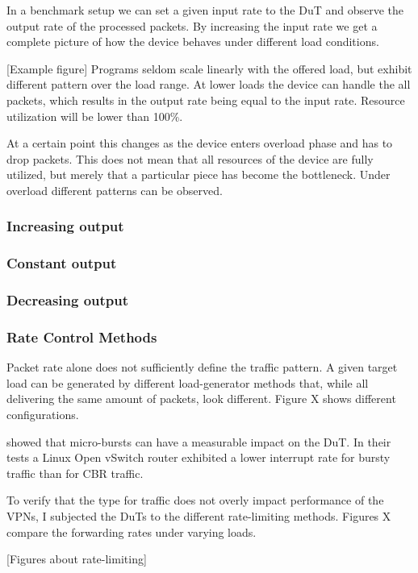 \documentclass[IN,11pt,twoside,openright,master,english]{tumthesis}
\begin{document}
In a benchmark setup we can set a given input rate to the DuT and observe the output rate of the processed packets. 
By increasing the input rate we get a complete picture of how the device behaves under different load conditions.

[Example figure]
Programs seldom scale linearly with the offered load, but exhibit different pattern over the load range. At lower loads the device can handle the all packets, which results in the output rate being equal to the input rate. Resource utilization will be lower than 100\%.

At a certain point this changes as the device enters overload phase and has to drop packets. This does not mean that all resources of the device are fully utilized, but merely that a particular piece has become the bottleneck.
Under overload different patterns can be observed.

\subsubsection{Increasing output}
\subsubsection{Constant output}
\subsubsection{Decreasing output}


\subsubsection{Rate Control Methods}
Packet rate alone does not sufficiently define the traffic pattern. A given target load can be generated by different load-generator methods that, while all delivering the same amount of packets, look different. Figure X shows different configurations. 

\cite{emmerich2015moongen} showed that micro-bursts can have a measurable impact on the DuT. In their tests a Linux Open vSwitch router exhibited a lower interrupt rate for bursty traffic than for CBR traffic.

To verify  that the type for traffic does not overly impact performance of the VPNs, I subjected the DuTs to the different rate-limiting methods. Figures X compare the forwarding rates under varying loads. 

[Figures about rate-limiting]
\end{document}
